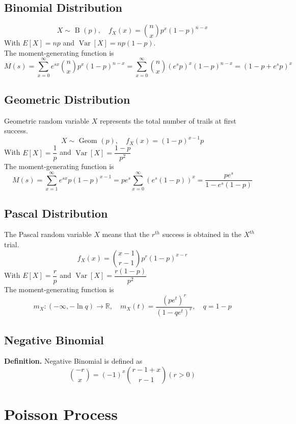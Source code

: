 \documentclass[a4paper,12pt]{article}
\begin{document}
    \subsection{Binomial Distribution}
    $$
    X \sim \text { B }(p), \quad f_X(x)=\binom{n}{x}  p^x(1-p)^{n-x}
$$
    With $E[X]=np$ and $\operatorname{Var}[X]=np(1-p)$.\\
    The moment-generating function is
    $$
M(s)=\sum_{x=0}^{\infty} e^{s x}\binom{n}{x} p^x(1-p)^{n-x}=\sum_{x=0}^{\infty}\binom{n}{x}\left(e^s p\right)^x(1-p)^{n-x}=\left(1-p+e^s p\right)^x
$$

    \subsection{Geometric Distribution}
    Geometric random variable $X$ represents the total number of trails at first success.
    $$
    X \sim \text { Geom }(p), \quad f_X(x)=(1-p)^{x-1} p
$$
    With $E[X]=\dfrac{1}{p}$ and $\operatorname{Var}[X]=\dfrac{1-p}{p^2}$\\
    The moment-generating function is
    $$
M(s)=\sum_{x=1}^{\infty} e^{s x} p(1-p)^{x-1}=p e^s \sum_{x=0}^{\infty}\left(e^s(1-p)\right)^x=\frac{p e^s}{1-e^s(1-p)}
$$

    \subsection{Pascal Distribution}
    The Pascal random variable $X$ means that the $r^{th}$ success is obtained in the $X^{th}$ trial.
    \begin{equation}
        f_X(x)=\binom{x-1}{r-1} p^r(1-p)^{x-r}
        \end{equation}
    With $E[X]=\dfrac{r}{p}$ and $\operatorname{Var}[X]=\dfrac{r(1-p)}{p^2}$\\
        The moment-generating function is
$$
m_X:(-\infty,-\ln q) \rightarrow \mathbb{R}, \quad m_X(t)=\frac{\left(p e^t\right)^r}{\left(1-q e^t\right)^r}, \quad q=1-p
$$
    \subsection{Negative Binomial}
    \textbf{Definition.} Negative Binomial is defined as
    \begin{equation}
        \binom{-r}{x} =(-1)^x\binom{r-1+x}{r-1}(r>0)
    \end{equation}

    \section{Poisson Process}
\end{document}
